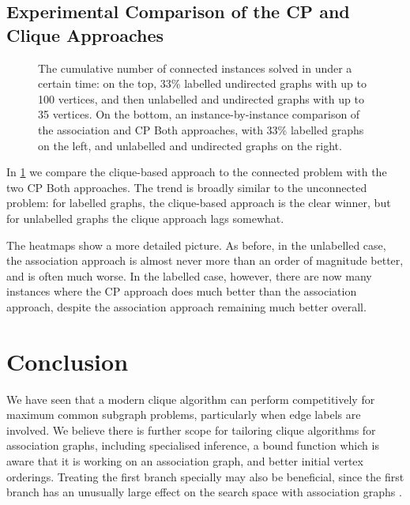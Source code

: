 \documentclass{llncs}
\begin{document}
\subsection{Experimental Comparison of the CP and Clique Approaches}\label{mccs-eval}

\begin{figure}[tb]
    \centering
    
    \vspace*{1em}

    \centering
    
    \caption{The cumulative number of connected instances solved in under a certain time: on the
        top, 33\% labelled undirected graphs with up to 100 vertices, and then unlabelled
        and undirected graphs with up to 35 vertices. On the bottom, an instance-by-instance
        comparison of the association and CP Both approaches, with 33\% labelled graphs on the
        left, and unlabelled and undirected graphs on the right.} \label{figure:connected-cumulative}
\end{figure}

In \cref{figure:connected-cumulative} we compare the clique-based approach to the connected problem
with the two CP Both approaches. The trend is broadly similar to the unconnected problem: for labelled
graphs, the clique-based approach is the clear winner, but for unlabelled graphs the clique approach
lags somewhat.

The heatmaps show a more detailed picture. As before, in the unlabelled case, the association
approach is almost never more than an order of magnitude better, and is often much worse. In the
labelled case, however, there are now many instances where the CP approach does much better than the
association approach, despite the association approach remaining much better overall.

\section{Conclusion}

We have seen that a modern clique algorithm can perform competitively for maximum common subgraph
problems, particularly when edge labels are involved.  We believe there is further scope for
tailoring clique algorithms for association graphs, including specialised inference, a bound
function which is aware that it is working on an association graph, and better initial vertex
orderings. Treating the first branch specially may also be beneficial, since the first branch has an
unusually large effect on the search space with association graphs
\cite{DBLP:conf/cocoon/SutersAZSSL05}.
\end{document}
